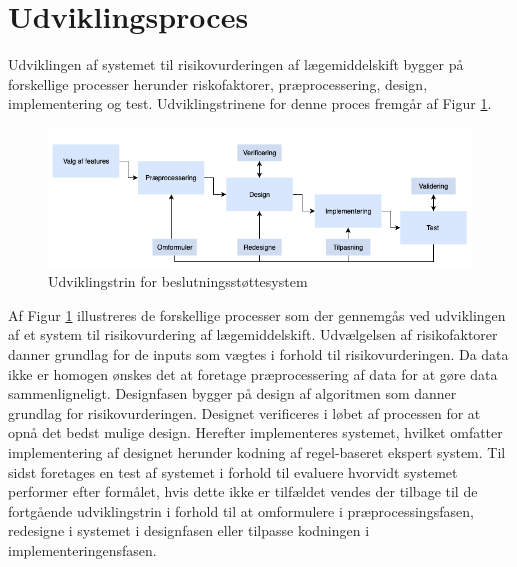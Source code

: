 \section{Udviklingsproces}
Udviklingen af systemet til risikovurderingen af lægemiddelskift bygger på forskellige processer herunder riskofaktorer, præprocessering, design, implementering og test. Udviklingstrinene for denne proces fremgår af Figur \ref{fig:metode}.

\begin{figure}[H]\centering	\includegraphics[width=1\textwidth]{billeder/udviklingstrin.png} 
	\caption{Udviklingstrin for beslutningsstøttesystem}
	\label{fig:metode}  
\end{figure}
\vspace{-0.5cm}

Af Figur \ref{fig:metode} illustreres de forskellige processer som der gennemgås ved udviklingen af et system til risikovurdering af lægemiddelskift. Udvælgelsen af risikofaktorer danner grundlag for de inputs som vægtes i forhold til risikovurderingen. Da data ikke er homogen ønskes det at foretage præprocessering af data for at gøre data sammenligneligt. Designfasen bygger på design af algoritmen som danner grundlag for risikovurderingen. Designet verificeres i løbet af processen for at opnå det bedst mulige design. Herefter implementeres systemet, hvilket omfatter implementering af designet herunder kodning af regel-baseret ekspert system. Til sidst foretages en test af systemet i forhold til evaluere hvorvidt systemet performer efter formålet, hvis dette ikke er tilfældet vendes der tilbage til de fortgående udviklingstrin i forhold til at omformulere i  præprocessingsfasen, redesigne i systemet i designfasen eller tilpasse kodningen i implementeringensfasen. 





